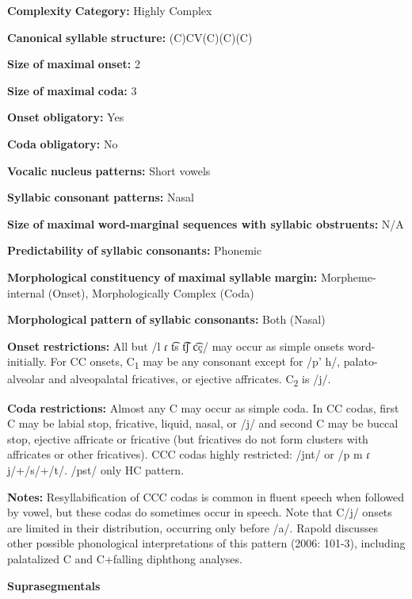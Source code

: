 \begin{styleBody}
\textbf{Complexity} \textbf{Category:} Highly Complex

\textbf{Canonical} \textbf{syllable} \textbf{structure:} (C)CV(C)(C)(C) \citep[91-112]{Rapold2006}

\textbf{Size} \textbf{of} \textbf{maximal} \textbf{onset:} 2

\textbf{Size} \textbf{of} \textbf{maximal} \textbf{coda:} 3

\textbf{Onset} \textbf{obligatory:} Yes

\textbf{Coda} \textbf{obligatory:} No

\textbf{Vocalic} \textbf{nucleus} \textbf{patterns:} Short vowels

\textbf{Syllabic} \textbf{consonant} \textbf{patterns:} Nasal

\textbf{Size} \textbf{of} \textbf{maximal} \textbf{word{}-marginal sequences with syllabic obstruents:} N/A

\textbf{Predictability} \textbf{of} \textbf{syllabic} \textbf{consonants:} Phonemic

\textbf{Morphological} \textbf{constituency} \textbf{of} \textbf{maximal} \textbf{syllable} \textbf{margin:} Morpheme-internal (Onset), Morphologically Complex (Coda)

\textbf{Morphological} \textbf{pattern} \textbf{of} \textbf{syllabic} \textbf{consonants:} Both (Nasal)

\textbf{Onset} \textbf{restrictions:} All but /l ɾ t͡s t͡ʃ c͡ç/ may occur as simple onsets word-initially. For CC onsets, C\textsubscript{1} may be any consonant except for /p’ h/, palato-alveolar and alveopalatal fricatives, or ejective affricates. C\textsubscript{2} is /j/.

\textbf{Coda} \textbf{restrictions:} Almost any C may occur as simple coda. In CC codas, first C may be labial stop, fricative, liquid, nasal, or /j/ and second C may be buccal stop, ejective affricate or fricative (but fricatives do not form clusters with affricates or other fricatives). CCC codas highly restricted: /jnt/ or /p m ɾ j/+/s/+/t/. /pst/ only HC pattern.

\textbf{Notes:} Resyllabification of CCC codas is common in fluent speech when followed by vowel, but these codas do sometimes occur in speech. Note that C/j/ onsets are limited in their distribution, occurring only before /a/. Rapold discusses other possible phonological interpretations of this pattern (2006: 101-3), including palatalized C and C+falling diphthong analyses.

\textbf{Suprasegmentals}


\end{styleBody}
